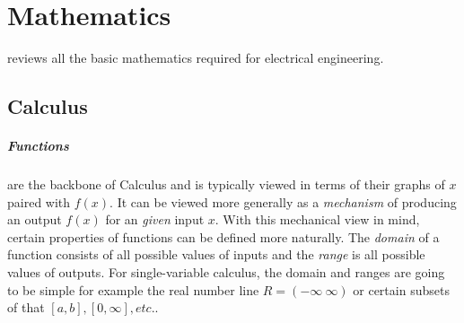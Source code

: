 \cleardoublepage
\chapter{Mathematics}
\label{ch:math}

 reviews all the basic mathematics required for electrical engineering. 



\section{Calculus}
\paragraph{Functions} are the backbone of Calculus and is typically viewed in terms of their graphs of $x$ paired with $f(x)$. It can be viewed more generally as a {\it mechanism} of producing an output $f(x)$ for an {\it given} input $x$. With this mechanical view in mind, certain properties of functions can be defined more naturally. The {\it domain} of a function consists of all possible values of inputs and the {\it range} is all possible values of outputs. For single-variable calculus, the domain and ranges are going to be simple for example the real number line $R=(-\infty ~\infty)$ or certain subsets of that $[a,b], [0, \infty], etc.$.
